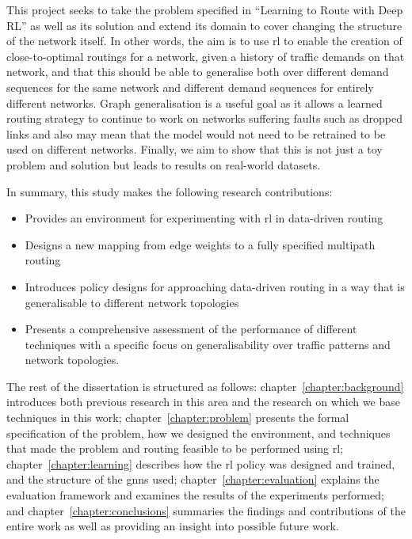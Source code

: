This project seeks to take the problem specified in \enquote{Learning to Route with Deep RL} as well as its solution and extend its domain to cover changing the structure of the network itself. In other words, the aim is to use \ac{rl} to enable the creation of close-to-optimal routings for a network, given a history of traffic demands on that network, and that this should be able to generalise both over different demand sequences for the same network and different demand sequences for entirely different networks. Graph generalisation is a useful goal as it allows a learned routing strategy to continue to work on networks suffering faults such as dropped links and also may mean that the model would not need to be retrained to be used on different networks. Finally, we aim to show that this is not just a toy problem and solution but leads to results on real-world datasets.

In summary, this study makes the following research contributions:
\begin{itemize}
  \item Provides an environment for experimenting with \ac{rl} in data-driven routing
  \item Designs a new mapping from edge weights to a fully specified multipath routing
  \item Introduces policy designs for approaching data-driven routing in a way that is generalisable to different network topologies
  \item Presents a comprehensive assessment of the performance of different techniques with a specific focus on generalisability over traffic patterns and network topologies.
\end{itemize}

The rest of the dissertation is structured as follows: chapter~\ref{chapter:background} introduces both previous research in this area and the research on which we base techniques in this work; chapter~\ref{chapter:problem} presents the formal specification of the problem, how we designed the environment, and techniques that made the problem and routing feasible to be performed using \ac{rl}; chapter~\ref{chapter:learning} describes how the \ac{rl} policy was designed and trained, and the structure of the \acp{gnn} used; chapter~\ref{chapter:evaluation} explains the evaluation framework and examines the results of the experiments performed; and chapter~\ref{chapter:conclusions} summaries the findings and contributions of the entire work as well as providing an insight into possible future work.

